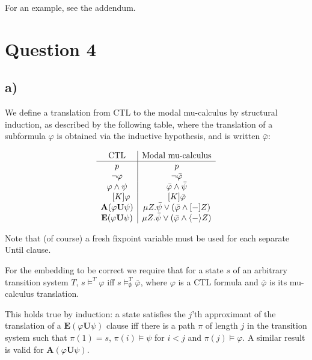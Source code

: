 \documentclass[11pt]{article}
\begin{document}
For an example, see the addendum.

\section*{Question 4}
\subsection*{a)}

We define a translation from CTL to the modal mu-calculus by structural
induction, as described by the following table, where the translation of a
subformula $\varphi$ is obtained via the inductive hypothesis, and is written
$\bar{\varphi}$:

\begin{displaymath}
\begin{array}{c | c}
\text{CTL} & \text{Modal mu-calculus} \\
\hline
p                   & p \\
\neg \varphi        & \neg \bar{\varphi} \\
\varphi \wedge \psi & \bar{\varphi} \wedge \bar{\psi} \\
\quad [K]\varphi    & [K] \bar{\varphi} \\
\textbf{A}(\varphi \textbf{U} \psi) & \mu Z . \bar{\psi} \vee ( \bar{\varphi} \wedge [-] Z ) \\
\textbf{E}(\varphi \textbf{U} \psi) & \mu Z . \bar{\psi} \vee ( \bar{\varphi} \wedge \langle - \rangle Z ) \\

\end{array}
\end{displaymath}

Note that (of course) a fresh fixpoint variable must be used for each separate
Until clause.

For the embedding to be correct we require that for a state $s$ of an arbitrary
transition system $T$, $s \models^{T} \varphi$ iff $s \models^{T}_{\emptyset}
\bar{\varphi}$, where $\varphi$ is a CTL formula and $\bar{\varphi}$ is its
mu-calculus translation.

This holds true by induction: a state satisfies the $j$'th approximant of the translation of
a $\textbf{E}(\varphi\textbf{U}\psi)$ clause iff there is a path $\pi$ of length $j$ in the transition system such
that $\pi(1) = s$, $\pi(i) \models \psi$ for $i < j$ and $\pi(j) \models \varphi$.
A similar result is valid for $\textbf{A}(\varphi\textbf{U}\psi)$.
\end{document}
